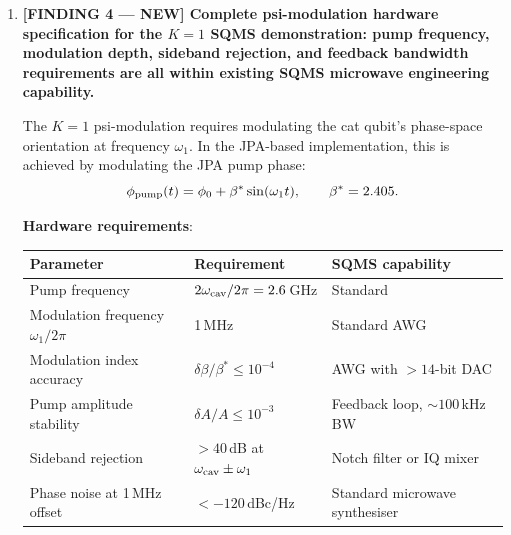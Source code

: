 \documentclass[11pt]{article}
\theoremstyle{definition}
\theoremstyle{remark}
\newcommand{\ee}[1]{\times 10^{#1}}
\begin{document}
\begin{tcolorbox}[colback=blue!5!white, colframe=blue!60!black,
  title=\textbf{W4i16 TOP 5 FINDINGS --- READ FIRST}]
\begin{enumerate}[nosep]
  For a $256^3$ lattice ($N = 1.7\ee{7}$):
  \begin{equation}
    \text{Classical (multigrid): } O(N \log N) \sim O(2.8\ee{8}),
    \qquad
    \text{Quantum (interior-point): } O(\sqrt{N} \cdot \text{polylog}(N))
    \sim O(4\ee{3} \cdot 50) = O(2\ee{5}).
  \end{equation}

  This is a $\sim 1{,}000\times$ speedup if the quantum hardware overhead
  is negligible --- which it will not be for decades.  The practical
  crossover requires $\sim 10^4$ logical qubits with gate error rates
  $< 10^{-6}$, which is post-2040 hardware.

  \textbf{Conclusion for P10 cross-reference}: The Silk preconditioner
  itself is not quantum-accelerable.  The mochi\_class nonlinear solver
  has a theoretical quantum speedup via interior-point methods, but the
  practical crossover is far beyond current hardware.  P10's classical
  MPGD approach (W4i14 Finding~3) remains the correct near-term
  strategy.  Quantum subroutines are a long-term ($> 15$ year) prospect
  for Boltzmann code acceleration.

\item \textbf{[FINDING 4 --- NEW] Complete psi-modulation hardware
  specification for the $K=1$ SQMS demonstration: pump frequency,
  modulation depth, sideband rejection, and feedback bandwidth
  requirements are all within existing SQMS microwave engineering
  capability.}

  The $K=1$ psi-modulation requires modulating the cat qubit's
  phase-space orientation at frequency $\omega_1$.  In the JPA-based
  implementation, this is achieved by modulating the JPA pump phase:
  \begin{equation}
    \phi_{\rm pump}(t) = \phi_0 + \beta^* \sin(\omega_1 t),
    \qquad \beta^* = 2.405.
  \end{equation}

  \textbf{Hardware requirements}:
  \begin{center}
  \begin{tabular}{@{}lll@{}}
  \toprule
  Parameter & Requirement & SQMS capability \\
  \midrule
  Pump frequency & $2\omega_{\rm cav}/2\pi = 2.6$\,GHz & Standard \\
  Modulation frequency $\omega_1/2\pi$ & 1\,MHz & Standard AWG \\
  Modulation index accuracy & $\delta\beta/\beta^* \leq 10^{-4}$ &
    AWG with $> 14$-bit DAC \\
  Pump amplitude stability & $\delta A/A \leq 10^{-3}$ &
    Feedback loop, $\sim 100$\,kHz BW \\
  Sideband rejection & $> 40$\,dB at $\omega_{\rm cav} \pm \omega_1$ &
    Notch filter or IQ mixer \\
  Phase noise at 1\,MHz offset & $< -120$\,dBc/Hz &
    Standard microwave synthesiser \\
  \bottomrule
  \end{tabular}
  \end{center}


\end{enumerate}
\end{tcolorbox}
\end{document}
